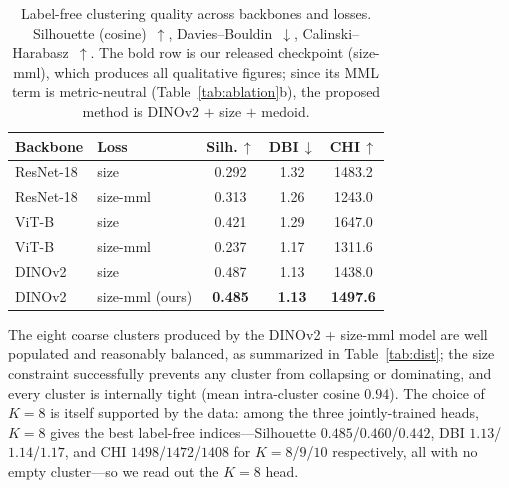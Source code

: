 \documentclass[10pt,a4paper,twocolumn]{article}
\begin{document}
\begin{table}[t]
\centering
\caption{Label-free clustering quality across backbones and losses. Silhouette (cosine)~$\uparrow$, Davies--Bouldin~$\downarrow$, Calinski--Harabasz~$\uparrow$. The bold row is our released checkpoint (size-mml), which produces all qualitative figures; since its MML term is metric-neutral (Table~\ref{tab:ablation}b), the proposed method is DINOv2 $+$ size $+$ medoid.}
\label{tab:metrics}
\small
\begin{tabular}{@{}llccc@{}}
\toprule
Backbone   & Loss      & Silh.\,$\uparrow$ & DBI\,$\downarrow$ & CHI\,$\uparrow$ \\
\midrule
ResNet-18  & size      & 0.292 & 1.32 & 1483.2 \\
ResNet-18  & size-mml  & 0.313 & 1.26 & 1243.0 \\
ViT-B      & size      & 0.421 & 1.29 & 1647.0 \\
ViT-B      & size-mml  & 0.237 & 1.17 & 1311.6 \\
DINOv2     & size      & 0.487 & 1.13 & 1438.0 \\
DINOv2     & size-mml (ours) & \textbf{0.485} & \textbf{1.13} & \textbf{1497.6} \\
\bottomrule
\end{tabular}
\end{table}

The eight coarse clusters produced by the DINOv2 + size-mml model are well populated and reasonably balanced, as summarized in Table~\ref{tab:dist}; the size constraint successfully prevents any cluster from collapsing or dominating, and every cluster is internally tight (mean intra-cluster cosine $0.94$). The choice of $K\!=\!8$ is itself supported by the data: among the three jointly-trained heads, $K\!=\!8$ gives the best label-free indices---Silhouette $0.485$/$0.460$/$0.442$, DBI $1.13$/$1.14$/$1.17$, and CHI $1498$/$1472$/$1408$ for $K\!=\!8$/$9$/$10$ respectively, all with no empty cluster---so we read out the $K\!=\!8$ head.
\end{document}
